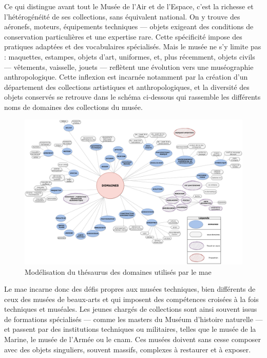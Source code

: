 Ce qui distingue avant tout le Musée de l’Air et de l’Espace, c’est la richesse et l’hétérogénéité de ses collections, sans équivalent national. On y trouve des aéronefs, moteurs, équipements techniques — objets exigeant des conditions de conservation particulières et une expertise rare. Cette spécificité impose des pratiques adaptées et des vocabulaires spécialisés. Mais le musée ne s’y limite pas : maquettes, estampes, objets d’art, uniformes, et, plus récemment, objets civils — vêtements, vaisselle, jouets — reflètent une évolution vers une muséographie anthropologique. Cette inflexion est incarnée notamment par la création d'un département des collections artistiques et anthropologiques, et la diversité des objets conservés se retrouve dans le schéma ci-dessous qui rassemble les différents noms de domaines des collections du musée.

\begin{figure}[htbp]
	\centering
	\includegraphics[width=\linewidth]{img/MODEL_domaines.png}
	\caption{Modélisation du thésaurus des domaines utilisés par le \ac{mae}}
	\label{fig:model_domaines}
\end{figure}

Le \ac{mae} incarne donc des défis propres aux musées techniques, bien différents de ceux des musées de beaux-arts et qui imposent des compétences croisées à la fois techniques et muséales. Les jeunes chargés de collections sont ainsi souvent issus de formations spécialisés — comme les masters du Muséum d’histoire naturelle — et passent par des institutions techniques ou militaires, telles que le musée de la Marine, le musée de l’Armée ou le \ac{cnam}. Ces musées doivent sans cesse composer avec des objets singuliers, souvent massifs, complexes à restaurer et à exposer.

